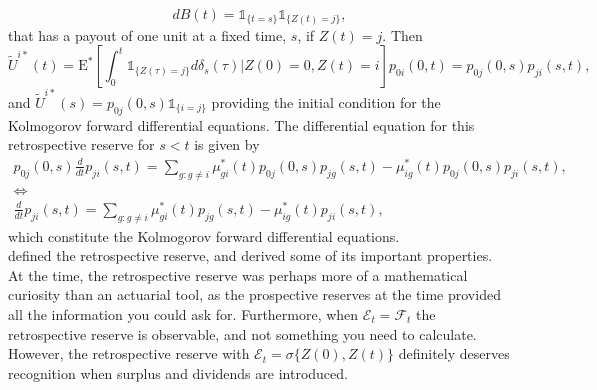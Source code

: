 \documentclass[12pt]{article}
\newcommand{\E}{\text{E}}
\newcommand{\indic}[1]{\mathds{1}_{ \{ #1 \} }}
\theoremstyle{my_thm}
\begin{document}
$$
dB(t)=\indic{t=s}\indic{Z(t)=j},
$$
that has a payout of one unit at a fixed time, $s$, if $Z(t)=j$. Then 
$$
\tilde{U}^{i*}(t)=\E^* \left[ \int_0^t  \indic{Z(\tau)=j} d\delta_{s}(\tau) |Z(0)=0, Z(t)=i \right] p_{0i}(0,t) = p_{0j}(0,s)p_{ji}(s,t),
$$
and $\tilde{U}^{i*}(s)=p_{0j}(0,s)\indic{i=j}$ providing the initial condition for the Kolmogorov forward differential equations. The differential equation for this retrospective reserve for $s<t$ is given by 
\begin{gather*}
p_{0j}(0,s)\frac{d}{dt}p_{ji}(s,t)= \sum_{g:g\neq i} \mu^*_{gi}(t)p_{0j}(0,s)p_{jg}(s,t)- \mu^*_{ig}(t)p_{0j}(0,s)p_{ji}(s,t),
\\
\Leftrightarrow
\\
\frac{d}{dt}p_{ji}(s,t)= \sum_{g:g\neq i} \mu^*_{gi}(t)p_{jg}(s,t)- \mu^*_{ig}(t)p_{ji}(s,t),
\end{gather*}
which constitute the Kolmogorov forward differential equations. 
\\[12pt]
\citet{Norberg} defined the retrospective reserve, and derived some of its important properties. At the time, the retrospective reserve was perhaps more of a mathematical curiosity than an actuarial tool, as the prospective reserves at the time provided all the information you could ask for. Furthermore, when $\mathcal{E}_t=\mathcal{F}_t$ the retrospective reserve is observable, and not something you need to calculate. However, the retrospective reserve with $\mathcal{E}_t=\sigma \{Z(0),Z(t)\}$ definitely deserves recognition when surplus and dividends are introduced.
\end{document}

